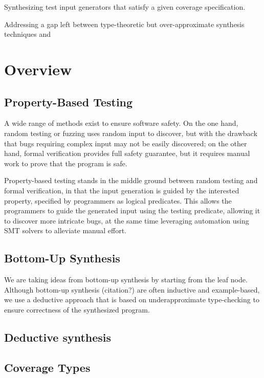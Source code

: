 \documentclass[review, sigplan]{acmart}
\begin{document}
Synthesizing test input generators that satisfy a given coverage specification.

Addressing a gap left between type-theoretic but over-approximate synthesis
techniques and

\section{Overview}

\subsection{Property-Based Testing}
A wide range of methods exist to ensure software safety. On the one hand, random testing or fuzzing uses random input to discover, but with the drawback that bugs requiring complex input may not be easily discovered; on the other hand, formal verification provides full safety guarantee, but it requires manual work to prove that the program is safe. 

Property-based testing stands in the middle ground between random testing and formal verification, in that the input generation is guided by the interested property, specified by programmers as logical predicates. This allows the programmers to guide the generated input using the testing predicate, allowing it to discover more intricate bugs, at the same time leveraging automation using SMT solvers to alleviate manual effort.

\subsection{Bottom-Up Synthesis}
We are taking ideas from bottom-up synthesis by starting from the leaf node. Although bottom-up synthesis (citation?) are often inductive and example-based, we use a deductive approach that is based on underapproximate type-checking to ensure correctness of the synthesized program.

\subsection{Deductive synthesis}

\subsection{Coverage Types}
\end{document}

